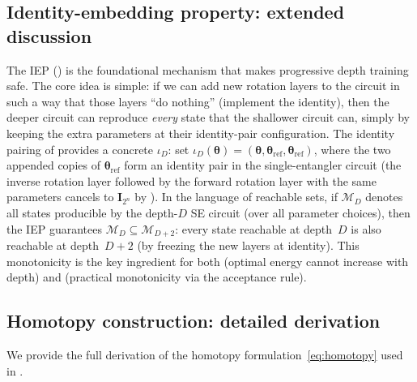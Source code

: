 \documentclass[11pt]{article}
\newcommand{\cM}{\mathcal{M}}
\theoremstyle{plain}
\theoremstyle{plain}
\begin{document}
\subsection{Identity-embedding property: extended discussion}
\label{app:iep_extended}
The IEP () is the foundational mechanism that makes
progressive depth training safe.  The core idea is simple: if we can
add new rotation layers to the circuit in such a way that those layers
``do nothing'' (implement the identity), then the deeper circuit can
reproduce \emph{every} state that the shallower circuit can, simply by
keeping the extra parameters at their identity-pair configuration.
The identity pairing of  provides a concrete
$\iota_D$: set
$\iota_D(\bm\theta)=(\bm\theta,\bm\theta_{\mathrm{ref}},
\bm\theta_{\mathrm{ref}})$, where the two appended copies of
$\bm\theta_{\mathrm{ref}}$ form an identity pair in the
single-entangler circuit (the inverse rotation layer followed by the
forward rotation layer with the same parameters cancels to $\mathbf{I}_{2^n}$
by ).
In the language of reachable sets, if $\cM_D$ denotes all states
producible by the depth-$D$ SE circuit (over all parameter choices),
then the IEP guarantees $\cM_D\subseteq\cM_{D+2}$: every state
reachable at depth~$D$ is also reachable at depth~$D{+}2$ (by
freezing the new layers at identity).  This monotonicity
is the key ingredient for both  (optimal
energy cannot increase with depth) and  (practical
monotonicity via the acceptance rule).
\subsection{Homotopy construction: detailed derivation}
\label{app:homotopy_extended}
We provide the full derivation of the homotopy
formulation~\eqref{eq:homotopy} used in .
\end{document}
